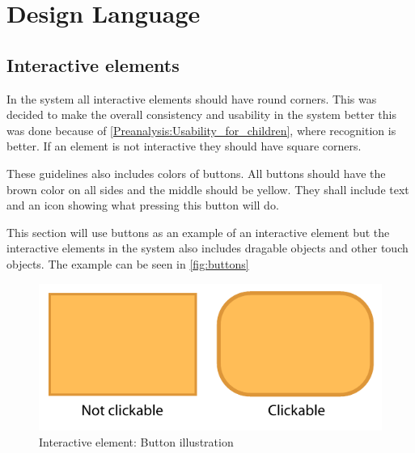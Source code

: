 \section{Design Language}
\label{design:design_language}

\subsection{Interactive elements}
\label{design:button_design}

In the \giraf[] system all interactive elements should have round corners. This was decided to make the overall consistency and usability in the \giraf[] system better this was done because of \autoref{Preanalysis:Usability_for_children}, where recognition is better.
If an element is not interactive they should have square corners.

These guidelines also includes colors of buttons. All buttons should have the brown color on all sides and the middle should be yellow. They shall include text and an icon showing what pressing this button will do.

This section will use buttons as an example of an interactive element but the interactive elements in the \giraf[] system also includes dragable objects and other touch objects. The example can be seen in \autoref{fig:buttons}

\begin{figure}[h!]
	\centering
	\includegraphics[scale=0.6]{gfx/buttons.pdf}
	\caption{Interactive element: Button illustration}
	\label{fig:buttons}
\end{figure}